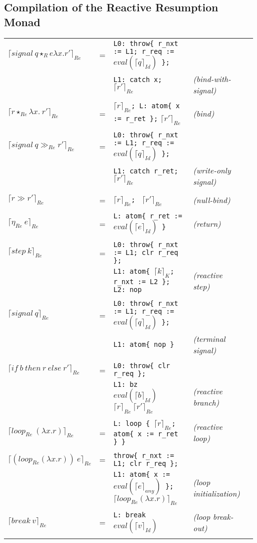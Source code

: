 \documentclass{article}
\newcommand{\compile}[2]{\lceil #2 \rceil_{#1}}
\newcommand{\atom}[1]{\texttt{atom\{ #1 \}}}
\newcommand{\throw}[1]{\texttt{throw\{ #1 \}}}
\newcommand{\nullbind}[0]{\gg}
\begin{document}
\subsection{Compilation of the Reactive Resumption Monad}

\begin{tabular}{lllll}

$\compile{Re}{signal\ q \star_Re \lambda x.r\prime}$ &=& \texttt{L0: }\throw{r\_nxt := L1; r\_req := $eval(\compile{Id}{q})$}\texttt{;}\\
&&\texttt{L1: catch x; }$\compile{Re}{r\prime}$ &\emph{(bind-with-signal)}\\
\\
$\compile{Re}{r \star_{Re} \lambda x.\ r\prime}$ &=& $\compile{Re}{r}$\texttt{; L: \atom{x := r\_ret};} $\compile{Re}{r\prime}$ &\emph{(bind)}\\
\\
$\compile{Re}{signal\ q \nullbind_{Re} r\prime}$ &=& \texttt{L0: }\throw{r\_nxt := L1; r\_req := $eval(\compile{Id}{q})$}\texttt{;}\\
&&\texttt{L1: catch r\_ret; }$\compile{Re}{r\prime}$ &\emph{(write-only signal)}\\
\\
$\compile{Re}{r \nullbind r\prime}$ &=& $\compile{Re}{r}$\texttt{; } $\compile{Re}{r\prime}$ &\emph{(null-bind)}\\
\\
$\compile{Re}{\eta_{Re}\ e}$ &=& \texttt{L: }\atom{r\_ret := $eval(\compile{Id}{e})$} &\emph{(return)}\\
\\
$\compile{Re}{step\ k}$ &=& \texttt{L0: }\throw{r\_nxt := L1; clr r\_req}\texttt{;}\\
&&\texttt{L1:  }\atom{$\compile{K}{k}$; r\_nxt := L2}\texttt{; L2: nop}&\emph{(reactive step)}\\
\\
$\compile{Re}{signal\ q}$ &=& \texttt{L0: }\throw{r\_nxt := L1; r\_req := $eval(\compile{Id}{q})$}\texttt{;}\\
&&\texttt{L1: }\atom{nop}&\emph{(terminal signal)}\\
\\
$\compile{Re}{if\ b\ then\ r\ else\ r\prime}$ &=& \texttt{L0: }\throw{clr r\_req}\texttt{;}\\
&&\texttt{L1: bz }$eval(\compile{Id}{b})$ $\compile{Re}{r}\ \compile{Re}{r\prime}$&\emph{(reactive branch)}\\
\\
$\compile{Re}{loop_{Re}\ (\lambda x.r)}$ &=& \texttt{L: loop \{ }$\compile{Re}{r}$\texttt{; \atom{x := r\_ret}}\texttt{ \} }&\emph{(reactive loop)}\\
\\
$\compile{Re}{(loop_{Re} (\lambda x.r))\ e}$ &=& \throw{r\_nxt := L1; clr r\_req}\texttt{;}\\
&&\texttt{L1: }\atom{x := $eval(\compile{any}{e})$}\texttt{; }$\compile{Re}{loop_{Re} (\lambda x.r)}$&\emph{(loop initialization)}\\
\\
$\compile{Re}{break\ v}$ &=& \texttt{L: break $eval(\compile{Id}{v})$}&\emph{(loop break-out)}\\
\\



\end{tabular}
\end{document}
